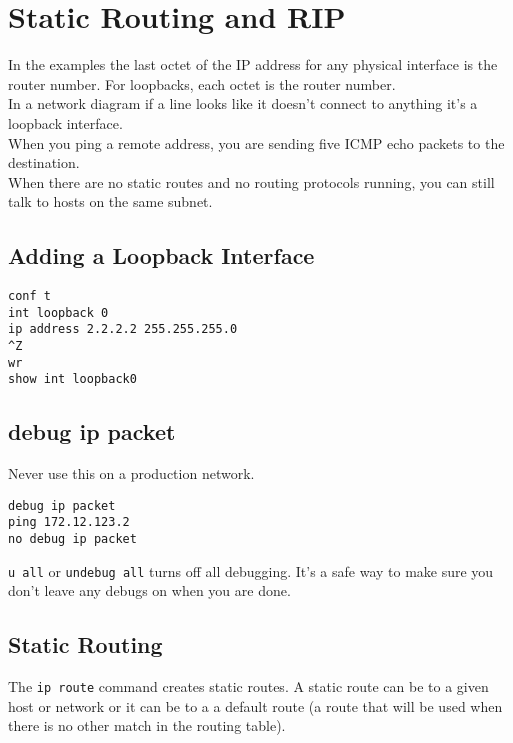 \section{Static Routing and RIP}

In the examples the last octet of the IP address for any physical interface
is the router number. For loopbacks, each octet is the router number.\\

In a network diagram if a line looks like it doesn't connect to anything
it's a loopback interface.\\

When you ping a remote address, you are sending five ICMP echo packets to
the destination.\\

When there are no static routes and no routing protocols running, you can
still talk to hosts on the same subnet.

\subsection{Adding a Loopback Interface}

\begin{verbatim}
conf t
int loopback 0
ip address 2.2.2.2 255.255.255.0
^Z
wr
show int loopback0
\end{verbatim}

\subsection{debug ip packet}

Never use this on a production network.

\begin{verbatim}
debug ip packet
ping 172.12.123.2
no debug ip packet
\end{verbatim}

\texttt{u all} or \texttt{undebug all} turns off all debugging. It's a safe
way to make sure you don't leave any debugs on when you are done.

\subsection{Static Routing}

The \texttt{ip route} command creates static routes. A static route can
be to a given host or network or it can be to a a default route (a route that
will be used when there is no other match in the routing table).

